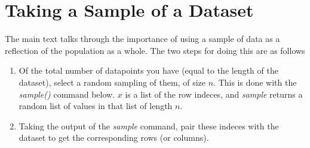 \vspace{0.5cm} 

\section{Taking a Sample of a Dataset}
The main text talks through the importance of using a sample of data as a reflection of the population as a whole.  The two steps for doing this are as follows
\begin{enumerate}
\item Of the total number of datapoints you have (equal to the length of the dataset), select a random sampling of them, of size $n$.  This is done with the \textit{sample()} command below.  $x$ is a list of the row indeces, and \textit{sample} returns a random list of values in that list of length $n$. 
\item Taking the output of the \textit{sample} command, pair these indeces with the dataset to get the corresponding rows (or columns).  
\end{enumerate}

\begin{knitrout}
\color{fgcolor}\begin{kframe}
\begin{alltt}
\hlstd{(}\hlstd{)}
 \hlkwb{=} \hlstd{(} \hlstd{= (}\hlopt{:}  \hlstd{=} \hlstd{,}  \hlstd{=} \hlstd{)}
\end{alltt}


{\ttfamily\noindent\bfseries\color{errorcolor}{\#\# Error in nrow(yrbss): object 'yrbss' not found}}\begin{alltt}
 \hlkwb{=} 
\end{alltt}


{\ttfamily\noindent\bfseries\color{errorcolor}{\#\# Error in eval(expr, envir, enclos): object 'yrbss' not found}}\end{kframe}
\end{knitrout}

